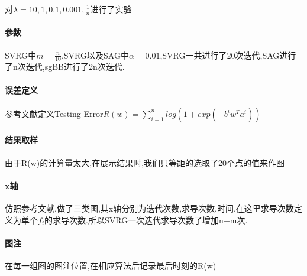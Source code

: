 \documentclass[UTF8]{ctexart}
\begin{document}
对$\lambda=10,1,0.1,0.001,\frac{1}{n}$进行了实验
\paragraph{参数}
SVRG中$m=\frac{n}{10}$,SVRG以及SAG中$\alpha=0.01$,SVRG一共进行了20次迭代,SAG进行了n次迭代,sgBB进行了2n次迭代.
\paragraph{误差定义}
参考文献定义Testing Error$R(w)=\sum_{i=1}^{n}log(1+exp(-b^iw^Ta^i))$
\paragraph{结果取样}
由于R(w)的计算量太大,在展示结果时,我们只等距的选取了20个点的值来作图
\paragraph{x轴}
仿照参考文献,做了三类图,其x轴分别为迭代次数,求导次数,时间.在这里求导次数定义为单个$f_i$的求导次数.所以SVRG一次迭代求导次数了增加n+m次.
\paragraph{图注}
在每一组图的图注位置,在相应算法后记录最后时刻的R(w)
\end{document}
